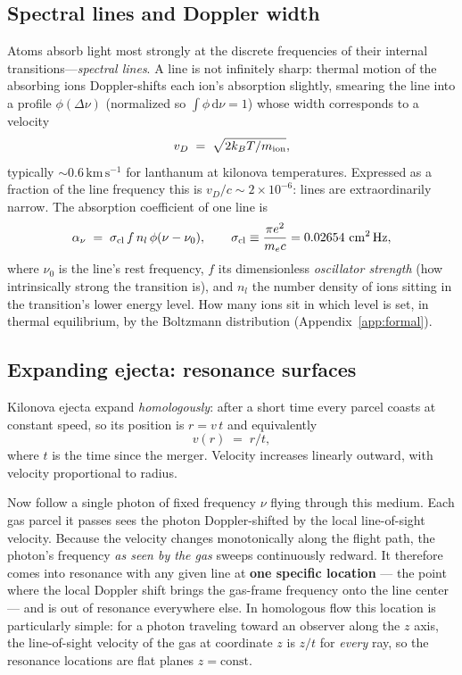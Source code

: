 \documentclass[fleqn,usenatbib]{mnras}
\newcommand{\kms}{\,\mathrm{km\,s^{-1}}}
\begin{document}
\subsection{Spectral lines and Doppler width}

Atoms absorb light most strongly at the discrete frequencies of their
internal transitions---\emph{spectral lines}. A line is not infinitely
sharp: thermal motion of the absorbing ions Doppler-shifts each ion's
absorption slightly, smearing the line into a profile $\phi(\Delta\nu)$
(normalized so $\int\phi\,\mathrm{d}\nu = 1$) whose width corresponds to a
velocity
\begin{equation}
  v_D \;=\; \sqrt{2 k_B T / m_{\rm ion}} ,
\end{equation}
typically $\sim 0.6\kms$ for lanthanum at kilonova temperatures. Expressed
as a fraction of the line frequency this is $v_D/c \sim 2\times10^{-6}$:
lines are extraordinarily narrow. The absorption coefficient of one line is
\begin{equation}
  \alpha_\nu \;=\; \sigma_{\rm cl}\, f\, n_l\, \phi(\nu - \nu_0),
  \qquad
  \sigma_{\rm cl} \equiv \frac{\pi e^2}{m_e c} = 0.02654\ \mathrm{cm^2\,Hz},
  \label{eq:linealpha}
\end{equation}
where $\nu_0$ is the line's rest frequency, $f$ its dimensionless
\emph{oscillator strength} (how intrinsically strong the transition is), and
$n_l$ the number density of ions sitting in the transition's lower energy
level. How many ions sit in which level is set, in thermal equilibrium, by
the Boltzmann distribution (Appendix~\ref{app:formal}).

\subsection{Expanding ejecta: resonance surfaces}

Kilonova ejecta expand \emph{homologously}: after a short time every parcel
coasts at constant speed, so its position is $r = v\,t$ and equivalently
\begin{equation}
  v(r) \;=\; r/t ,
  \label{eq:homologous}
\end{equation}
where $t$ is the time since the merger. Velocity increases linearly outward,
with velocity proportional to radius.

Now follow a single photon of fixed frequency $\nu$ flying through this
medium. Each gas parcel it passes sees the photon Doppler-shifted by the
local line-of-sight velocity. Because the velocity changes monotonically
along the flight path, the photon's frequency \emph{as seen by the gas}
sweeps continuously redward. It therefore comes into resonance with any
given line at \textbf{one specific location} --- the point where the local
Doppler shift brings the gas-frame frequency onto the line center --- and is
out of resonance everywhere else. In homologous flow this location is
particularly simple: for a photon traveling toward an observer along the
$z$ axis, the line-of-sight velocity of the gas at coordinate $z$ is $z/t$
for \emph{every} ray, so the resonance locations are flat planes
$z = \mathrm{const}$.
\end{document}
